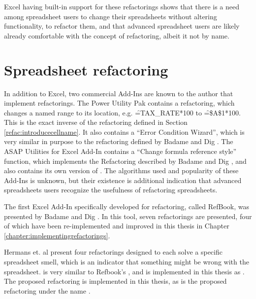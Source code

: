 Excel having built-in support for these refactorings shows that there is a need among spreadsheet users to change their spreadsheets without altering functionality, to refactor them, and that advanced spreadsheet users are likely already comfortable with the concept of refactoring, albeit it not by name.

\section{Spreadsheet refactoring}

In addition to Excel, two commercial Add-Ins are known to the author that implement refactorings.
The Power Utility Pak \cite{PuPv7} contains a  refactoring, which changes a named range to its location, e.g. \f{=TAX_RATE*100} to \f{=\$A\$1*100}.
This is the exact inverse of the  refactoring defined in Section \ref{refac:introducecellname}.
It also contains a ``Error Condition Wizard'', which is very similar in purpose to the  refactoring defined by Badame and Dig \cite{badame2012refactoring}.
The ASAP Utilities for Excel \cite{ASAP5} Add-In contains a ``Change formula reference style'' function, which implements the  Refactoring described by Badame and Dig \cite{badame2012refactoring}, and also contains its own version of .
The algorithms used and popularity of these Add-Ins is unknown, but their existence is additional indication that advanced spreadsheets users recognize the usefulness of refactoring spreadsheets.

The first Excel Add-In specifically developed for refactoring, called RefBook, was presented by Badame and Dig \cite{badame2012refactoring}.
In this tool, seven refactorings are presented, four of which have been re-implemented and improved in this thesis in Chapter \ref{chapter:implementingrefactorings}.

Hermans et. al \cite{hermans2014detecting} present four refactorings designed to each solve a specific spreadsheet smell, which is an indicator that something might be wrong with the spreadsheet.
 is very similar to Refbook's , and is implemented in this thesis as .
The proposed  refactoring is implemented in this thesis, as is the proposed  refactoring under the name .

\newpage

